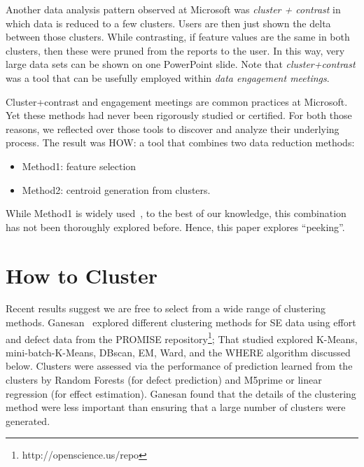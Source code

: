 \documentclass[conference]{IEEEtran}
\newcommand{\bi}{\begin{itemize}}
\newcommand{\ei}{\end{itemize}}
\begin{document}
	Another data analysis pattern observed
	at Microsoft was  {\em cluster + contrast} in which
	data is  reduced to a few
	clusters. Users are then just shown the delta between those
	clusters. While contrasting, if feature values are
	the same in both clusters, then these were pruned from
	the reports to the user. In this way, very large
	data sets can be shown on one PowerPoint
	slide. Note that {\em cluster+contrast} was a tool that can be usefully employed within
	{\em data engagement meetings}.
	
	
	Cluster+contrast and engagement
	meetings are common practices at Microsoft. Yet  these methods had never been rigorously studied or certified.
	For both those reasons,
	we reflected over those tools to discover and analyze their
	underlying process. The result was HOW: a tool
	that combines two
	data reduction methods:\bi
	\item Method1: feature selection
	\item Method2: centroid generation from   clusters.
	\ei
	While Method1 is widely used~\cite{Menzies2010},
	to the best of our knowledge, this combination has not been thoroughly explored before.
	Hence, this paper explores ``peeking''.
	
	\section{How to Cluster}
	Recent results suggest  we are free to select from a wide range of 
	clustering methods.  Ganesan~\cite{div14} explored 
	different clustering methods for SE data using   effort and defect data from
	the PROMISE repository\footnote{http://openscience.us/repo};
	That studied explored
	K-Means, mini-batch-K-Means, DBscan, EM, Ward, and the WHERE algorithm discussed
	below.
	Clusters were assessed via the performance of prediction 
	learned from the clusters by Random Forests (for defect prediction)
	and M5prime or linear regression (for effect estimation).  Ganesan found
	that the details of the clustering method were less important than ensuring that  a large number of clusters were generated.
	
\end{document}
